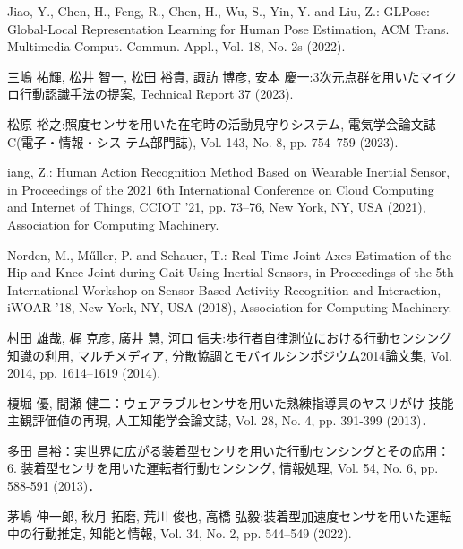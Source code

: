\begin{thebibliography}{参考文献}
	Jiao, Y., Chen, H., Feng, R., Chen, H., Wu, S., Yin, Y. and Liu, Z.: GLPose: Global-Local Representation Learning for Human Pose Estimation, ACM Trans. Multimedia Comput. Commun. Appl., Vol. 18, No. 2s (2022).

	三嶋 祐輝, 松井 智一, 松田 裕貴, 諏訪 博彦, 安本 慶一:3次元点群を用いたマイクロ行動認識手法の提案, Technical Report 37 (2023).

	松原 裕之:照度センサを用いた在宅時の活動見守りシステム, 電気学会論文誌C(電子・情報・シス テム部門誌), Vol. 143, No. 8, pp. 754–759 (2023).

	iang, Z.: Human Action Recognition Method Based on Wearable Inertial Sensor, in Proceedings of the 2021 6th International Conference on Cloud Computing and Internet of Things, CCIOT ’21, pp. 73–76, New York, NY, USA (2021), Association for Computing Machinery.

	Norden, M., Műller, P. and Schauer, T.: Real-Time Joint Axes Estimation of the Hip and Knee Joint during Gait Using Inertial Sensors, in Proceedings of the 5th International Workshop on Sensor-Based Activity Recognition and Interaction, iWOAR ’18, New York, NY, USA (2018), Association for Computing Machinery.

	村田 雄哉, 梶 克彦, 廣井 慧, 河口 信夫:歩行者自律測位における行動センシング知識の利用, マルチメディア, 分散協調とモバイルシンポジウム2014論文集, Vol. 2014, pp. 1614–1619 (2014).
	
	榎堀 優, 間瀬 健二：ウェアラブルセンサを用いた熟練指導員のヤスリがけ
	技能主観評価値の再現, 人工知能学会論文誌, Vol. 28, No. 4, pp. 391-399 (2013)．
	
	多田 昌裕：実世界に広がる装着型センサを用いた行動センシングとその応用：6. 装着型センサを用いた運転者行動センシング, 情報処理, Vol. 54, No. 6, pp. 588-591 (2013)．

	茅嶋 伸一郎, 秋月 拓磨, 荒川 俊也, 高橋 弘毅:装着型加速度センサを用いた運転中の行動推定, 知能と情報, Vol. 34, No. 2, pp. 544–549 (2022).



\end{thebibliography}
